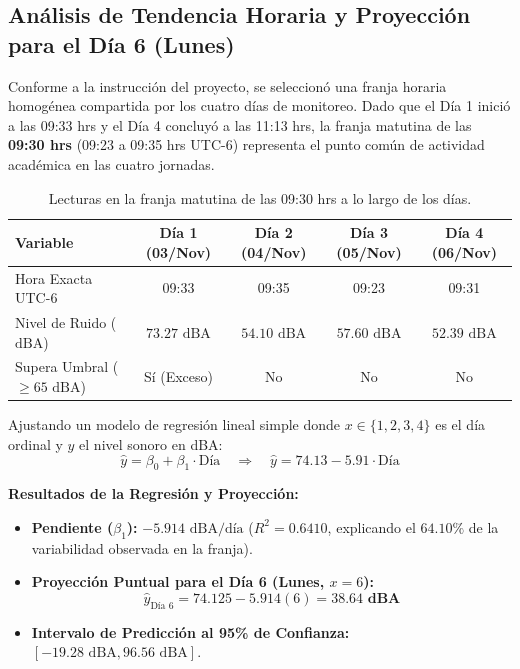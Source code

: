 \documentclass{article}
\begin{document}
\subsection{Análisis de Tendencia Horaria y Proyección para el Día 6 (Lunes)}
Conforme a la instrucción del proyecto, se seleccionó una franja horaria homogénea compartida por los cuatro días de monitoreo. Dado que el Día 1 inició a las 09:33 hrs y el Día 4 concluyó a las 11:13 hrs, la franja matutina de las \textbf{09:30 hrs} (09:23 a 09:35 hrs UTC-6) representa el punto común de actividad académica en las cuatro jornadas.

\begin{table}[H]
\centering
\caption{Lecturas en la franja matutina de las 09:30 hrs a lo largo de los días.}
\label{tab:franja_hora}
\vspace{0.2cm}
\begin{tabular}{l c c c c}
\toprule
\textbf{Variable} & \textbf{Día 1 (03/Nov)} & \textbf{Día 2 (04/Nov)} & \textbf{Día 3 (05/Nov)} & \textbf{Día 4 (06/Nov)} \\
\midrule
Hora Exacta UTC-6 & 09:33 & 09:35 & 09:23 & 09:31 \\
Nivel de Ruido ($\text{dBA}$) & $73.27\text{ dBA}$ & $54.10\text{ dBA}$ & $57.60\text{ dBA}$ & $52.39\text{ dBA}$ \\
Supera Umbral ($\ge 65\text{ dBA}$) & Sí (Exceso) & No & No & No \\
\bottomrule
\end{tabular}
\end{table}

Ajustando un modelo de regresión lineal simple donde $x \in \{1, 2, 3, 4\}$ es el día ordinal y $y$ el nivel sonoro en dBA:
\begin{equation}
    \hat{y} = \beta_0 + \beta_1 \cdot \text{Día} \quad \Longrightarrow \quad \hat{y} = 74.13 - 5.91 \cdot \text{Día}
\end{equation}

\noindent\textbf{Resultados de la Regresión y Proyección:}
\begin{itemize}
    \item \textbf{Pendiente ($\beta_1$):} $-5.914\text{ dBA/día}$ ($R^2 = 0.6410$, explicando el $64.10\%$ de la variabilidad observada en la franja).
    \item \textbf{Proyección Puntual para el Día 6 (Lunes, $x = 6$):}
    \begin{equation}
        \hat{y}_{\text{Día 6}} = 74.125 - 5.914(6) = \mathbf{38.64\text{ dBA}}
    \end{equation}
    \item \textbf{Intervalo de Predicción al 95\% de Confianza:} $[-19.28\text{ dBA}, 96.56\text{ dBA}]$.
\end{itemize}
\end{document}
